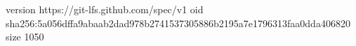 version https://git-lfs.github.com/spec/v1
oid sha256:5a056dffa9abaab2dad978b2741537305886b2195a7e1796313faa0dda406820
size 1050
